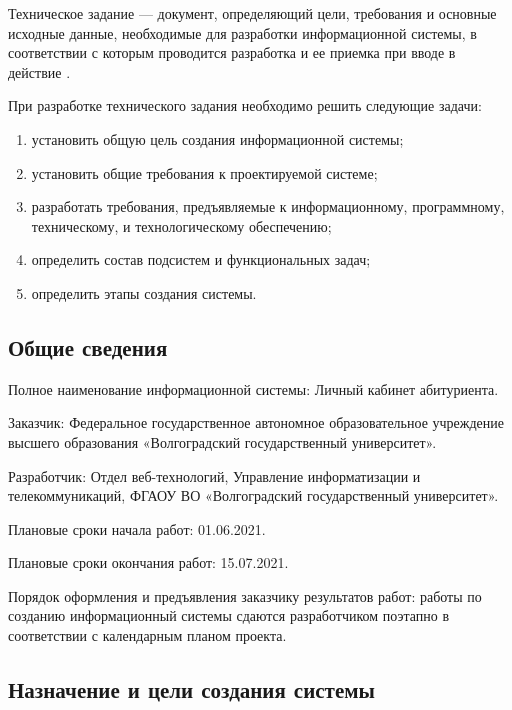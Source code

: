 Техническое задание — документ, определяющий цели, требования и основные исходные данные, необходимые для разработки информационной системы, в соответствии с которым проводится разработка и ее приемка при вводе в действие \cite{gost34}.

При разработке технического задания необходимо решить следующие задачи:

\begin{enumerate} 
  \item установить общую цель создания информационной системы;
  
  \item установить общие требования к проектируемой системе;
  
  \item разработать требования, предъявляемые к информационному, программному, техническому, и технологическому обеспечению;
  
  \item определить состав подсистем и функциональных задач;
  
  \item определить этапы создания системы.
\end{enumerate}

\subsection{Общие сведения}

Полное наименование информационной системы: Личный кабинет абитуриента.

Заказчик: Федеральное государственное автономное образовательное учреждение высшего образования «Волгоградский государственный университет».

Разработчик: Отдел веб-технологий, Управление информатизации и телекоммуникаций, ФГАОУ ВО «Волгоградский государственный университет».

Плановые сроки начала работ: 01.06.2021.

Плановые сроки окончания работ: 15.07.2021.

Порядок оформления и предъявления заказчику результатов работ: работы по созданию информационный системы сдаются разработчиком поэтапно в соответствии с календарным планом проекта.

\subsection{Назначение и цели создания системы}

